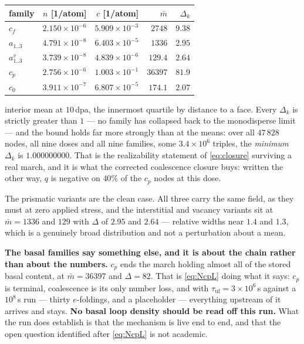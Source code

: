 \documentclass{article}
\begin{document}
\begin{center}\small
\begin{tabular}{@{}lrrrr@{}}
\toprule
family & $n$ [1/atom] & $c$ [1/atom] & $\bar m$ & $\Delta_k$ \\
\midrule
$c_f$        & $2.150\times10^{-6}$ & $5.909\times10^{-3}$ & $2748$  & $9.38$ \\
$a_{1..3}$   & $4.791\times10^{-8}$ & $6.403\times10^{-5}$ & $1336$  & $2.95$ \\
$a^v_{1..3}$ & $3.739\times10^{-8}$ & $4.839\times10^{-6}$ & $129.4$ & $2.64$ \\
$c_p$        & $2.756\times10^{-6}$ & $1.003\times10^{-1}$ & $36397$ & $81.9$ \\
$c_0$        & $3.911\times10^{-7}$ & $6.807\times10^{-5}$ & $174.1$ & $2.07$ \\
\bottomrule
\end{tabular}
\end{center}

interior mean at $10$\,dpa, the innermost quartile by distance to a face. Every
$\Delta_k$ is strictly greater than $1$ --- no family has collapsed back to the
monodisperse limit --- and the bound holds far more strongly than at the means:
over all $47\,828$ nodes, all nine doses and all nine families, some
$3.4\times10^{6}$ triples, the \emph{minimum} $\Delta_k$ is $1.000000000$. That
is the realizability statement of \cref{eq:closure} surviving a real march, and
it is what the corrected coalescence closure buys: written the other way, $q$ is
negative on $40\%$ of the $c_p$ nodes at this dose.

The prismatic variants are the clean case. All three carry the same field, as
they must at zero applied stress, and the interstitial and vacancy variants sit
at $\bar m=1336$ and $129$ with $\Delta$ of $2.95$ and $2.64$ --- relative widths
near $1.4$ and $1.3$, which is a genuinely broad distribution and not a
perturbation about a mean.

\textbf{The basal families say something else, and it is about the chain rather
than about the numbers.} $c_p$ ends the march holding almost all of the stored
basal content, at $\bar m=36397$ and $\Delta=82$. That is \cref{eq:NcpL} doing
what it says: $c_p$ is terminal, coalescence is its only number loss, and with
$\tau_{\mathrm{uf}}=3\times10^{6}$\,s against a $10^{8}$\,s run --- thirty
$e$-foldings, and a placeholder --- everything upstream of it arrives and stays.
\textbf{No basal loop density should be read off this run.} What the run does
establish is that the mechanism is live end to end, and that the open question
identified after \cref{eq:NcpL} is not academic.
\end{document}
